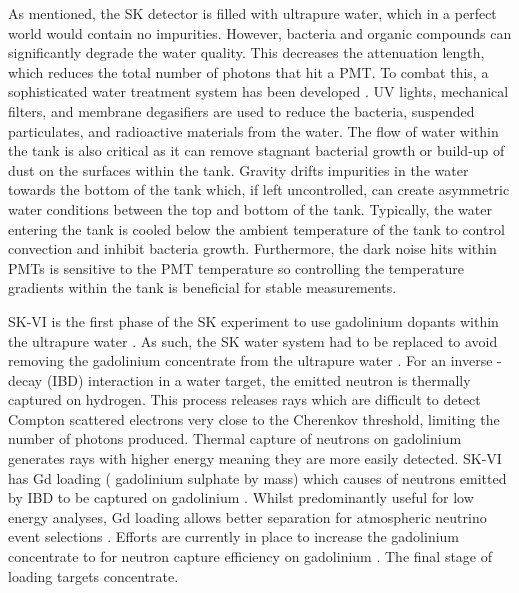 As mentioned, the SK detector is filled with ultrapure water, which in a perfect world would contain no impurities. However, bacteria and organic compounds can significantly degrade the water quality. This decreases the attenuation length, which reduces the total number of photons that hit a PMT. To combat this, a sophisticated water treatment system has been developed \cite{Fukuda2003-ly, Nakano2020-sb}. UV lights, mechanical filters, and membrane degasifiers are used to reduce the bacteria, suspended particulates, and radioactive materials from the water. The flow of water within the tank is also critical as it can remove stagnant bacterial growth or build-up of dust on the surfaces within the tank. Gravity drifts impurities in the water towards the bottom of the tank which, if left uncontrolled, can create asymmetric water conditions between the top and bottom of the tank.
Typically, the water entering the tank is cooled below the ambient temperature of the tank to control convection and inhibit bacteria growth. Furthermore, the  dark noise hits within PMTs is sensitive to the PMT temperature \cite{HamamatsuPMT} so controlling the temperature gradients within the tank is beneficial for stable measurements.

SK-VI is the first phase of the SK experiment to use gadolinium dopants within the ultrapure water . As such, the SK water system had to be replaced to avoid removing the gadolinium concentrate from the ultrapure water \cite{Abe2022-qq}. For an inverse \quickmath{\beta}-decay (IBD) interaction in a water target, the emitted neutron is thermally captured on hydrogen. This process releases  \quickmath{\gamma} rays which are difficult to detect   Compton scattered electrons   very close to the Cherenkov threshold, limiting the number of photons produced. Thermal capture of neutrons on gadolinium generates \quickmath{\gamma} rays with higher energy  meaning they are more easily detected. SK-VI has  Gd loading ( gadolinium sulphate by mass) which causes  of neutrons emitted by IBD to be captured on gadolinium\cite{PhysRevLett.93.171101,Marti2020-le} . Whilst predominantly useful for low energy analyses, Gd loading allows better \quickmath{\nu/\bar{\nu}} separation for atmospheric neutrino event selections \cite{Marti2019-gu}. Efforts are currently in place to increase the gadolinium concentrate to  for  neutron capture efficiency on gadolinium . The final stage of loading targets  concentrate.

